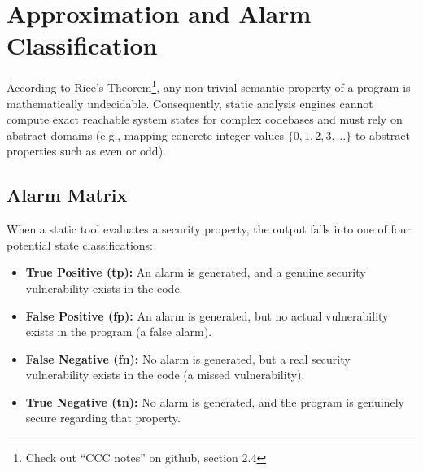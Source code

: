 \section{Approximation and Alarm Classification}

According to Rice's Theorem\footnote{Check out ``CCC notes'' on github, section 2.4}, any non-trivial semantic property of a program is mathematically undecidable. Consequently, static analysis engines cannot compute exact reachable system states for complex codebases and must rely on abstract domains (e.g., mapping concrete integer values $\{0, 1, 2, 3, \dots\}$ to abstract properties such as $\text{even}$ or $\text{odd}$).

\subsection{Alarm Matrix}
When a static tool evaluates a security property, the output falls into one of four potential state classifications:

\begin{itemize}
    \item \textbf{True Positive (\gls{tp}):} An alarm is generated, and a genuine security vulnerability exists in the code.
    \item \textbf{False Positive (\gls{fp}):} An alarm is generated, but no actual vulnerability exists in the program (a false alarm).
    \item \textbf{False Negative (\gls{fn}):} No alarm is generated, but a real security vulnerability exists in the code (a missed vulnerability).
    \item \textbf{True Negative (\gls{tn}):} No alarm is generated, and the program is genuinely secure regarding that property.
\end{itemize}

